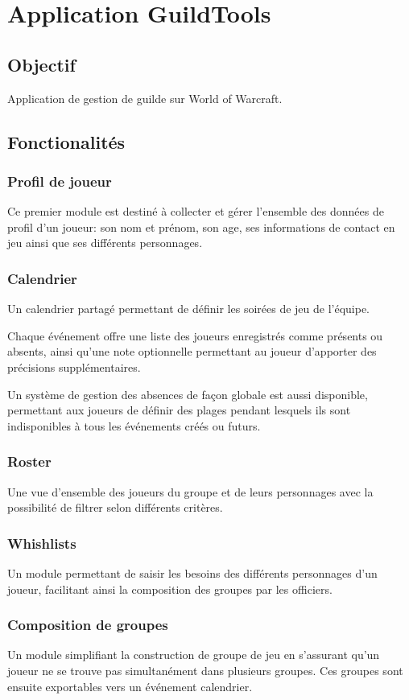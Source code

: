 \chapter{Application GuildTools}

\section{Objectif}

Application de gestion de guilde sur World of Warcraft.

\section{Fonctionalités}

	\subsection{Profil de joueur}

	Ce premier module est destiné à collecter et gérer l'ensemble des données de profil d'un joueur: son nom et prénom, son age, ses informations de contact en jeu ainsi que ses différents personnages.

	\subsection{Calendrier}
	
	Un calendrier partagé permettant de définir les soirées de jeu de l'équipe. 
	
	Chaque événement offre une liste des joueurs enregistrés comme présents ou absents, ainsi qu'une note optionnelle permettant au joueur d'apporter des précisions supplémentaires.
	
	Un système de gestion des absences de façon globale est aussi disponible, permettant aux joueurs de définir des plages pendant lesquels ils sont indisponibles à tous les événements créés ou futurs.
	
	\subsection{Roster}
	
	Une vue d'ensemble des joueurs du groupe et de leurs personnages avec la possibilité de filtrer selon différents critères.
	
	\subsection{Whishlists}
	
	Un module permettant de saisir les besoins des différents personnages d'un joueur, facilitant ainsi la composition des groupes par les officiers.
	
	\subsection{Composition de groupes}
	
	Un module simplifiant la construction de groupe de jeu en s'assurant qu'un joueur ne se trouve pas simultanément dans plusieurs groupes. Ces groupes sont ensuite exportables vers un événement calendrier.
	